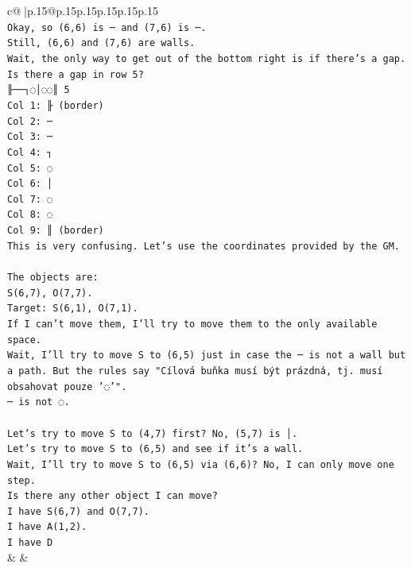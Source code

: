 \documentclass{article}
\begin{document}
{\begin{supertabular}{c@{$\;$}|p{.15\linewidth}@{}p{.15\linewidth}p{.15\linewidth}p{.15\linewidth}p{.15\linewidth}p{.15\linewidth}}
{{{\\ 
\texttt{Okay, so (6,6) is ─ and (7,6) is ─.} \\
\texttt{Still, (6,6) and (7,6) are walls.} \\
\texttt{Wait, the only way to get out of the bottom right is if there's a gap.} \\
\texttt{Is there a gap in row 5?} \\
\texttt{╟──┐◌│◌◌║ 5} \\
\texttt{Col 1: ╟ (border)} \\
\texttt{Col 2: ─} \\
\texttt{Col 3: ─} \\
\texttt{Col 4: ┐} \\
\texttt{Col 5: ◌} \\
\texttt{Col 6: │} \\
\texttt{Col 7: ◌} \\
\texttt{Col 8: ◌} \\
\texttt{Col 9: ║ (border)} \\
\texttt{This is very confusing. Let's use the coordinates provided by the GM.} \\
\\ 
\texttt{The objects are:} \\
\texttt{S(6,7), O(7,7).} \\
\texttt{Target: S(6,1), O(7,1).} \\
\texttt{If I can't move them, I'll try to move them to the only available space.} \\
\texttt{Wait, I'll try to move S to (6,5) just in case the ─ is not a wall but a path. But the rules say "Cílová buňka musí být prázdná, tj. musí obsahovat pouze '◌'".} \\
\texttt{─ is not ◌.} \\
\\ 
\texttt{Let's try to move S to (4,7) first? No, (5,7) is │.} \\
\texttt{Let's try to move S to (6,5) and see if it's a wall.} \\
\texttt{Wait, I'll try to move S to (6,5) via (6,6)? No, I can only move one step.} \\
\texttt{Is there any other object I can move?} \\
\texttt{I have S(6,7) and O(7,7).} \\
\texttt{I have A(1,2).} \\
\texttt{I have D} \\
            }
        }
    }
    & & \\ \\


\end{supertabular}}
\end{document}
